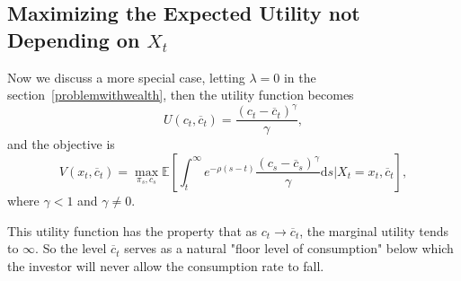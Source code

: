 \documentclass[a4paper]{article}
\theoremstyle{definition}
\numberwithin{equation}{section}
\begin{document}
\iffalse
\subsection{Maximizing the Expected Utility not Depending on $X_t$}
Now we discuss a more special case, letting $\lambda=0$ in the section~\ref{problemwithwealth}, then the utility function becomes
$$U(c_t,\overline c_t)=\frac{(c_t-\overline c_t)^\gamma}{\gamma},$$
and the objective is
$$V(x_t,\overline c_t)=\max_{\pi_s,c_s}\mathbb E[\int^\infty_te^{-\rho(s-t)}\frac{(c_s-\overline c_s)^\gamma}{\gamma}\mathrm ds\lvert X_t=x_t,\overline c_t],$$
where $\gamma<1$ and $\gamma\neq0$.

This utility function has the property that as $c_t\rightarrow\overline c_t$, the marginal utility tends to $\infty$. So the level $\overline c_t$ serves as a natural "floor level of consumption" below which the investor will never allow the consumption rate to fall.
\end{document}
